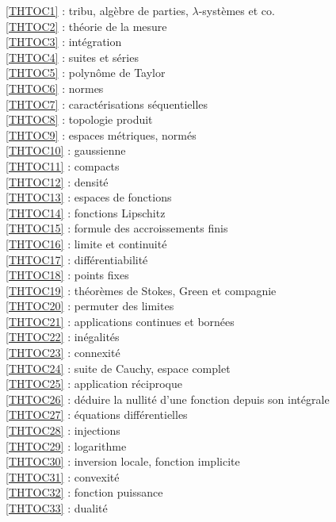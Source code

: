 \ref {THTOC1} : tribu, algèbre de parties, \( \lambda \)-systèmes et co.\\
\ref {THTOC2} : théorie de la mesure\\
\ref {THTOC3} : intégration\\
\ref {THTOC4} : suites et séries\\
\ref {THTOC5} : polynôme de Taylor\\
\ref {THTOC6} : normes\\
\ref {THTOC7} : caractérisations séquentielles\\
\ref {THTOC8} : topologie produit\\
\ref {THTOC9} : espaces métriques, normés\\
\ref {THTOC10} : gaussienne\\
\ref {THTOC11} : compacts\\
\ref {THTOC12} : densité\\
\ref {THTOC13} : espaces de fonctions\\
\ref {THTOC14} : fonctions Lipschitz\\
\ref {THTOC15} : formule des accroissements finis\\
\ref {THTOC16} : limite et continuité\\
\ref {THTOC17} : différentiabilité\\
\ref {THTOC18} : points fixes\\
\ref {THTOC19} : théorèmes de Stokes, Green et compagnie\\
\ref {THTOC20} : permuter des limites\\
\ref {THTOC21} : applications continues et bornées\\
\ref {THTOC22} : inégalités\\
\ref {THTOC23} : connexité\\
\ref {THTOC24} : suite de Cauchy, espace complet\\
\ref {THTOC25} : application réciproque\\
\ref {THTOC26} : déduire la nullité d'une fonction depuis son intégrale\\
\ref {THTOC27} : équations différentielles\\
\ref {THTOC28} : injections\\
\ref {THTOC29} : logarithme\\
\ref {THTOC30} : inversion locale, fonction implicite\\
\ref {THTOC31} : convexité\\
\ref {THTOC32} : fonction puissance\\
\ref {THTOC33} : dualité\\
